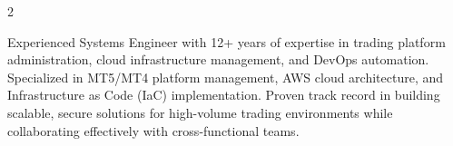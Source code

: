 \documentclass[11pt,a3paper,ragged2e,withhyper]{altacv}
\begin{document}
\begin{paracol}{2}


  \medskip
  Experienced Systems Engineer with 12+ years of expertise in trading platform administration, cloud infrastructure management, and DevOps automation. Specialized in MT5/MT4 platform management, AWS cloud architecture, and Infrastructure as Code (IaC) implementation. Proven track record in building scalable, secure solutions for high-volume trading environments while collaborating effectively with cross-functional teams.

  \medskip
{}

\medskip


\end{paracol}
\end{document}

